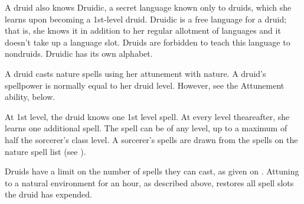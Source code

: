 A druid also knows Druidic, a secret language known only to druids, which she learns upon becoming a 1st-level druid.
Druidic is a free language for a druid; that is, she knows it in addition to her regular allotment of languages and it doesn't take up a language slot.
Druids are forbidden to teach this language to nondruids.
Druidic has its own alphabet.

A druid casts nature spells using her attunement with nature.
A druid's spellpower is normally equal to her druid level.
However, see the Attunement ability, below.

At 1st level, the druid knows one 1st level spell.
At every level theareafter, she learns one additional spell.
The spell can be of any level, up to a maximum of half the sorcerer's class level.
A sorcerer's spells are drawn from the spells on the nature spell list (see ).

Druids have a limit on the number of spells they can cast, as given on .
Attuning to a natural environment for an hour, as described above, restores all spell slots the druid has expended.

